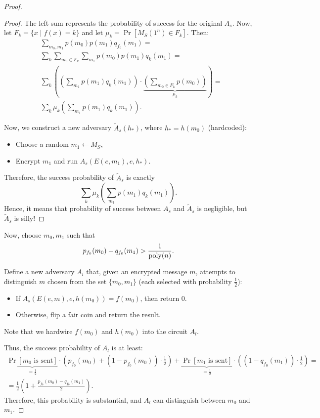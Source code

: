 \begin{proof}
\begin{proof}
		The left sum represents the probability of success for the original $A_s$.
		Now, let $F_k = \{x \mid f(x) = k\}$ and let $\mu_k = \Pr[M_S(1^{n}) \in F_k]$.
		Then:
		\begin{align*}
			&\sum_{m_0, m_1} p(m_0) p(m_1) q_{f_0}(m_1) = \\
			& \sum_{k} \sum_{m_0 \in F_k} \sum_{m_1} p(m_0) p(m_1) q_k(m_1) = \\   
			& \sum_{k} \left(\left(\sum_{m_1} p(m_1) q_k(m_1) \right) \cdot \underbrace{\left(\sum_{m_0 \in F_k} p(m_0)\right)}_{\mu_k} \right) = \\
			& \sum_{k} \mu_k \left( \sum_{m_1} p(m_1) q_k(m_1) \right).
		\end{align*}

		Now, we construct a new adversary $\tilde{A}_s(h_*)$, where $h_* = h(m_0)$ (hardcoded):
		\begin{itemize}
			\item Choose a random $m_1 \gets M_S$,
			\item Encrypt $m_1$ and run $A_s(E(e, m_1), e, h_*)$.
		\end{itemize}
		Therefore, the success probability of $\tilde{A}_s$ is exactly
		\[
		\sum_{k} \mu_k \left( \sum_{m_1} p(m_1) q_k(m_1) \right).
		\] 
		Hence, it means that probability of success between $A_s$ and  $\tilde A_s$ is negligible, but  $\tilde A_s$ is silly!
	\end{proof}

	Now, choose $m_0, m_1$ such that
	\[
		p_{f_0}(m_0) - q_{f_0}(m_1) > \frac{1}{\operatorname{poly}(n)}.
	\] 

	Define a new adversary $A_l$ that, given an encrypted message $m$, attempts to distinguish $m$ chosen from the set $\{m_0, m_1\}$ (each selected with probability $\frac{1}{2}$):
	\begin{itemize}
		\item If $A_s(E(e, m), e, h(m_0)) = f(m_0)$, then return 0.
		\item Otherwise, flip a fair coin and return the result.
	\end{itemize}
	Note that we hardwire $f(m_0)$ and $h(m_0)$ into the circuit $A_l$.

	Thus, the success probability of $A_l$ is at least:
	\begin{align*}
		\underbrace{\Pr[m_0 \text{ is sent}]}_{=\frac{1}{2}} \cdot \left(p_{f_0}(m_0) + (1 - p_{f_0}(m_0)) \cdot \frac{1}{2}\right) + \underbrace{\Pr[m_1 \text{ is sent}]}_{=\frac{1}{2}} \cdot \left((1 - q_{f_0}(m_1)) \cdot \frac{1}{2}\right) = \\
		= \frac{1}{2} \left(1 + \frac{p_{f_0}(m_0) - q_{f_0}(m_1)}{2}\right).
	\end{align*}
	Therefore, this probability is substantial, and $A_l$ can distinguish between $m_0$ and $m_1$.
\end{proof}

